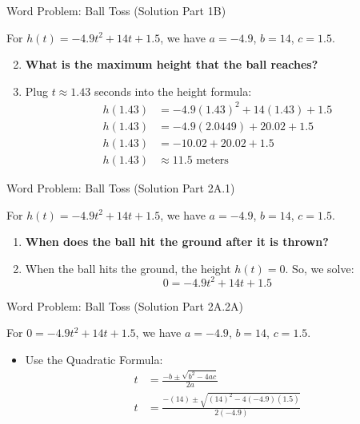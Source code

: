 \documentclass[aspectratio=169]{beamer}
\begin{document}
\begin{frame}{Word Problem: Ball Toss (Solution Part 1B)}
    \begin{tcolorbox}[colback=lightgray,colframe=accent,title=Solution Part 1B: Max Height Value]
        \footnotesize
        For $h(t) = -4.9t^2 + 14t + 1.5$, we have $a=-4.9$, $b=14$, $c=1.5$.
        \begin{enumerate}
            \setcounter{enumi}{1} %
            \item \textbf{What is the maximum height that the ball reaches?}
            \item Plug $t \approx 1.43$ seconds into the height formula:
                \begin{align*}
                    h(1.43) &= -4.9(1.43)^2 + 14(1.43) + 1.5 \\
                    h(1.43) &= -4.9(2.0449) + 20.02 + 1.5 \\
                    h(1.43) &= -10.02 + 20.02 + 1.5 \\
                    h(1.43) &\approx 11.5 \text{ meters}
                \end{align*}
        \end{enumerate}
    \end{tcolorbox}
\end{frame}

\begin{frame}{Word Problem: Ball Toss (Solution Part 2A.1)}
    \begin{tcolorbox}[colback=lightgray,colframe=accent,title=Solution Part 2A.1: Set up Equation]
        \footnotesize
        For $h(t) = -4.9t^2 + 14t + 1.5$, we have $a=-4.9$, $b=14$, $c=1.5$.
        \begin{enumerate}
            \item \textbf{When does the ball hit the ground after it is thrown?}
            \item When the ball hits the ground, the height $h(t) = 0$. So, we solve:
                \[ 0 = -4.9t^2 + 14t + 1.5 \]
        \end{enumerate}
    \end{tcolorbox}
\end{frame}

\begin{frame}{Word Problem: Ball Toss (Solution Part 2A.2A)}
    \begin{tcolorbox}[colback=lightgray,colframe=accent,title=Solution 2A.2A: Apply Quadratic Formula]
        \footnotesize
        For $0 = -4.9t^2 + 14t + 1.5$, we have $a=-4.9$, $b=14$, $c=1.5$.
        \begin{itemize}
            \item Use the Quadratic Formula:
                \begin{align*}
                    t &= \frac{-b \pm \sqrt{b^2 - 4ac}}{2a} \\
                    t &= \frac{-(14) \pm \sqrt{(14)^2 - 4(-4.9)(1.5)}}{2(-4.9)}
                \end{align*}
        \end{itemize}
    \end{tcolorbox}
\end{frame}
\end{document}
